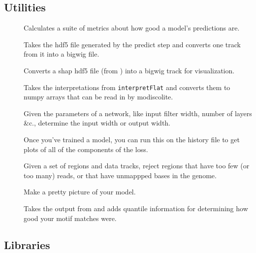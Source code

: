 \documentclass{article}
\begin{document}
\subsection{Utilities}

\begin{description}
    \item [] Calculates a suite of metrics about how good a model's predictions are.
    \item [] Takes the hdf5 file generated by the predict step and converts one
        track from it into a bigwig file.\label{prog:predictToBigwig}
    \item [] Converts a shap hdf5 file (from ) into a
        bigwig track for visualization.\label{prog:shapToBigwig}
    \item [] Takes the interpretations from \texttt{interpretFlat} and converts
        them to numpy arrays that can be read in by modiscolite.\label{prog:shapToNumpy}
    \item [] Given the parameters of a network, like input filter width, number of
        layers \&c., determine the input width or output width. \label{prog:lengthCalc}
    \item [] Once you've trained a model, you can run this on the history file
        to get plots of all of the components of the loss. \label{prog:makeLossPlots}
    \item [] Given a set of regions and data tracks, reject regions that have too
        few (or too many) reads, or that have unmappped bases in the genome.
    \item [] Make a pretty picture of your model. \label{prog:showModel}
    \item [] Takes the output from  and adds quantile
        information for determining how good your motif matches were.
\end{description}

\subsection{Libraries}
\end{document}

